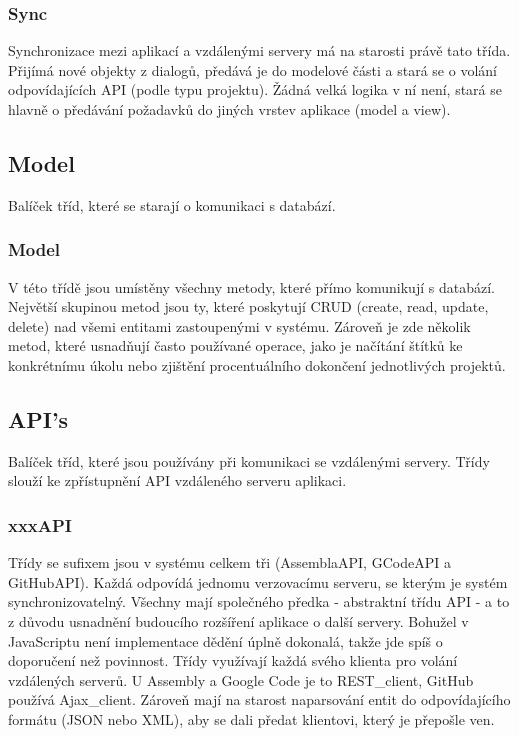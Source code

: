 \subsubsection{Sync}

Synchronizace mezi aplikací a vzdálenými servery má na starosti právě tato třída. Přijímá nové objekty z dialogů, předává je do modelové části a stará se o volání odpovídajících API (podle typu projektu). Žádná velká logika v ní není, stará se hlavně o předávání požadavků do jiných vrstev aplikace (model a view).

\subsection{Model}

Balíček tříd, které se starají o komunikaci s databází.

\subsubsection{Model}

V této třídě jsou umístěny všechny metody, které přímo komunikují s databází. Největší skupinou metod jsou ty, které poskytují CRUD (create, read, update, delete) nad všemi entitami zastoupenými v systému. Zároveň je zde několik metod, které usnadňují často používané operace, jako je načítání štítků ke konkrétnímu úkolu nebo zjištění procentuálního dokončení jednotlivých projektů.

\subsection{API's}

Balíček tříd, které jsou používány při komunikaci se vzdálenými servery. Třídy slouží ke zpřístupnění API vzdáleného serveru aplikaci.

\subsubsection{xxxAPI}

Třídy se sufixem  jsou v systému celkem tři (AssemblaAPI, GCodeAPI a GitHubAPI). Každá odpovídá jednomu verzovacímu serveru, se kterým je systém synchronizovatelný. Všechny mají společného předka - abstraktní třídu API - a to z důvodu usnadnění budoucího rozšíření aplikace o další servery. Bohužel v JavaScriptu není implementace dědění úplně dokonalá, takže jde spíš o doporučení než povinnost. Třídy využívají každá svého klienta pro volání vzdálených serverů. U Assembly a Google Code je to REST\_client, GitHub používá Ajax\_client. Zároveň mají na starost naparsování entit do odpovídajícího formátu (JSON nebo XML), aby se dali předat klientovi, který je přepošle ven.

